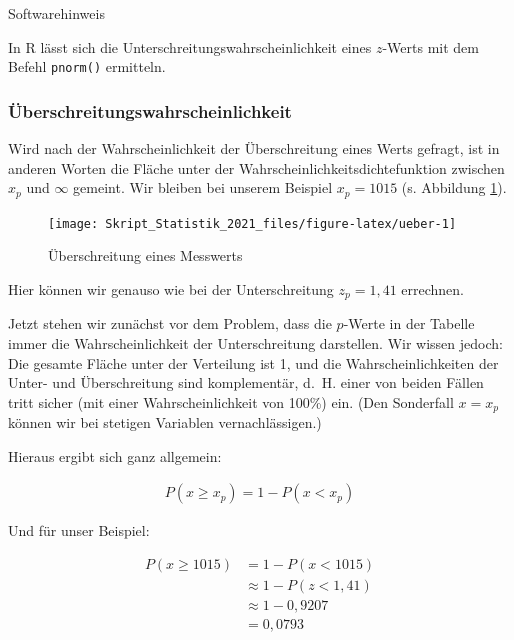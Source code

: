 \documentclass[
  11pt,
  ngerman,
  a4paper,
]{report}
\begin{document}
Softwarehinweis

In R lässt sich die Unterschreitungswahrscheinlichkeit eines \(z\)-Werts mit dem Befehl \texttt{pnorm()} ermitteln.

\hypertarget{uxfcberschreitungswahrscheinlichkeit}{%
\subsubsection{Überschreitungswahrscheinlichkeit}\label{uxfcberschreitungswahrscheinlichkeit}}

Wird nach der Wahrscheinlichkeit der Überschreitung eines Werts gefragt, ist in anderen Worten die Fläche unter der Wahrscheinlichkeitsdichtefunktion zwischen \(x_p\) und \(\infty\) gemeint. Wir bleiben bei unserem Beispiel \(x_p=1015\) (s. Abbildung \ref{fig:ueber}).

\begin{figure}[!h]

{\centering \texttt{[image: Skript\_Statistik\_2021\_files/figure-latex/ueber-1]} 

}

\caption{Überschreitung eines Messwerts}\label{fig:ueber}
\end{figure}

Hier können wir genauso wie bei der Unterschreitung \(z_p=1{,}41\) errechnen.

Jetzt stehen wir zunächst vor dem Problem, dass die \(p\)-Werte in der Tabelle immer die Wahrscheinlichkeit der Unterschreitung darstellen. Wir wissen jedoch: Die gesamte Fläche unter der Verteilung ist 1, und die Wahrscheinlichkeiten der Unter- und Überschreitung sind komplementär, d.~H. einer von beiden Fällen tritt sicher (mit einer Wahrscheinlichkeit von 100\%) ein. (Den Sonderfall \(x=x_p\) können wir bei stetigen Variablen vernachlässigen.)

Hieraus ergibt sich ganz allgemein:

\[
  \begin{aligned}
    P(x \geq x_p) = 1-P(x<x_p)
  \end{aligned}
  \label{eq:ueber}
\]

Und für unser Beispiel:

\[
  \begin{aligned}
    P(x \geq 1015) &= 1-P(x < 1015) \\
    &\approx1-P(z < 1,41)\\
    &\approx1-0{,}9207\\
    &= 0{,}0793
  \end{aligned}
\]
\end{document}
